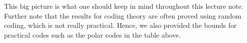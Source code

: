 This big picture is what one should keep in mind throughout this lecture note. Further note that the results for coding theory are often proved using random coding, which is not really practical. Hence, we also provided the bounds for practical codes such as the polar codes in the table above.



